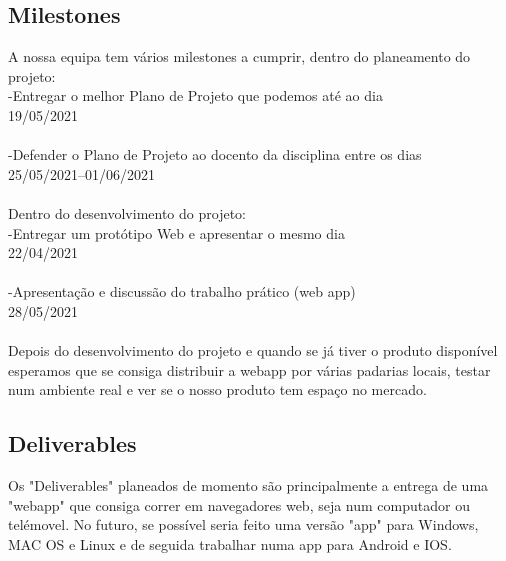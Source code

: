 \subsection{Milestones}
A nossa equipa tem vários milestones a cumprir, dentro do planeamento do projeto:
\\-Entregar o melhor Plano de Projeto que podemos até ao dia \\19/05/2021\\
\\-Defender o Plano de Projeto ao docento da disciplina entre os dias\\ 25/05/2021--01/06/2021\\
\\Dentro do desenvolvimento do projeto:
\\-Entregar um protótipo Web e apresentar o mesmo dia \\22/04/2021\\
\\-Apresentação e discussão do trabalho prático (web app) \\28/05/2021
\\\\Depois do desenvolvimento do projeto e quando se já tiver o produto disponível esperamos que se consiga distribuir a webapp por várias padarias locais, testar num ambiente real e ver se o nosso produto tem espaço no mercado.

\subsection{Deliverables}
Os "Deliverables" planeados de momento são principalmente a entrega de uma "webapp" que consiga correr em navegadores web, seja num computador ou telémovel. No futuro, se possível seria feito uma versão "app" para Windows, MAC OS e Linux e de seguida trabalhar numa app para Android e IOS.

